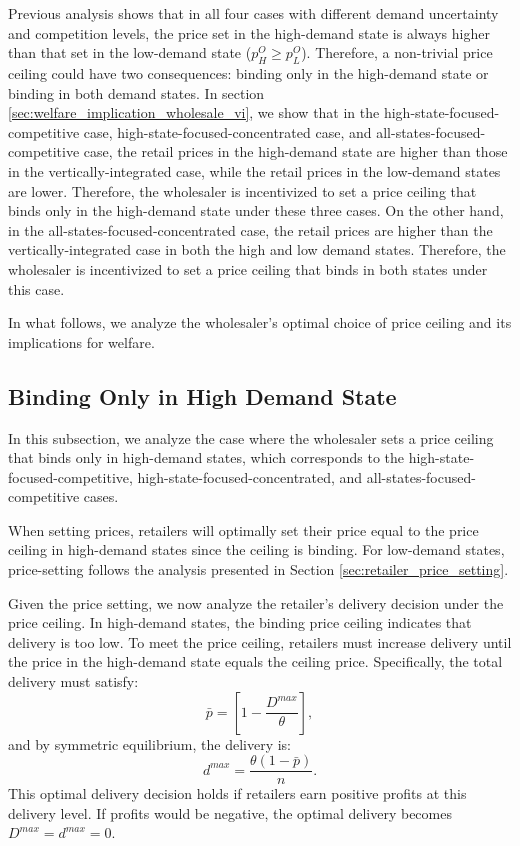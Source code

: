 \documentclass[12pt]{article}
\begin{document}
Previous analysis shows that in all four cases with different demand uncertainty and competition levels, the price set in the high-demand state is always higher than that set in the low-demand state ($p^O_H \geq p^O_L$). Therefore, a non-trivial price ceiling could have two consequences: binding only in the high-demand state or binding in both demand states.
In section \ref{sec:welfare_implication_wholesale_vi}, we show that in the high-state-focused-competitive case, high-state-focused-concentrated case, and all-states-focused-competitive case, the retail prices in the high-demand state are higher than those in the vertically-integrated case, while the retail prices in the low-demand states are lower. Therefore, the wholesaler is incentivized to set a price ceiling that binds only in the high-demand state under these three cases. On the other hand, in the all-states-focused-concentrated case, the retail prices are higher than the vertically-integrated case in both the high and low demand states. Therefore, the wholesaler is incentivized to set a price ceiling that binds in both states under this case.

In what follows, we analyze the wholesaler's optimal choice of price ceiling and its implications for welfare.

\subsection{Binding Only in High Demand State}

In this subsection, we analyze the case where the wholesaler sets a price ceiling that binds only in high-demand states, which corresponds to the high-state-focused-competitive, high-state-focused-concentrated, and all-states-focused-competitive cases.

When setting prices, retailers will optimally set their price equal to the price ceiling in high-demand states since the ceiling is binding. For low-demand states, price-setting follows the analysis presented in Section \ref{sec:retailer_price_setting}.

Given the price setting, we now analyze the retailer's delivery decision under the price ceiling. In high-demand states, the binding price ceiling indicates that delivery is too low. To meet the price ceiling, retailers must increase delivery until the price in the high-demand state equals the ceiling price. Specifically, the total delivery must satisfy:
\begin{equation}
	\bar{p} = \left[1 - \frac{D^{max}}{\theta}\right],
\end{equation}
and by symmetric equilibrium, the delivery is:
\begin{equation}
	d^{max} = \frac{\theta(1 - \bar{p})}{n}.
\end{equation}
This optimal delivery decision holds if retailers earn positive profits at this delivery level. If profits would be negative, the optimal delivery becomes $D^{max} = d^{max} = 0$.
\end{document}
